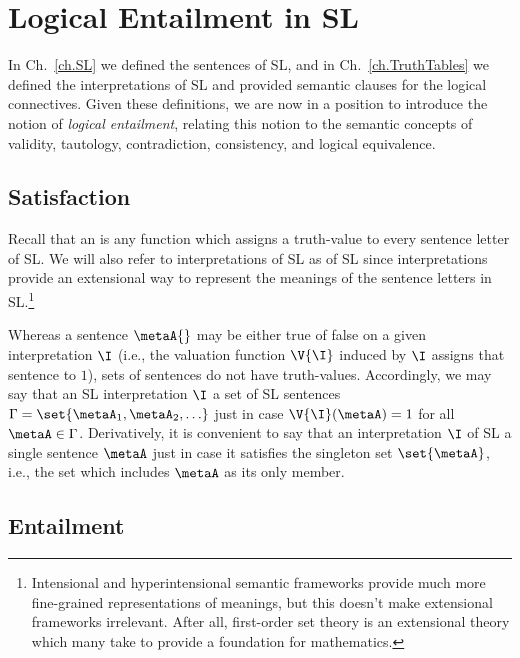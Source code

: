\chapter{Logical Entailment in SL}
\label{ch.SLmodels}

In Ch.~\ref{ch.SL} we defined the sentences of SL, and in Ch.~\ref{ch.TruthTables} we defined the interpretations of SL and provided semantic clauses for the logical connectives.
Given these definitions, we are now in a position to introduce the notion of \textit{logical entailment}, relating this notion to the semantic concepts of validity, tautology, contradiction, consistency, and logical equivalence.






\section{Satisfaction}
\label{sec:satisfaction}

Recall that an  is any function which assigns a truth-value to every sentence letter of SL.
We will also refer to interpretations of SL as  of SL since interpretations provide an extensional way to represent the meanings of the sentence letters in SL.\footnote{Intensional and hyperintensional semantic frameworks provide much more fine-grained representations of meanings, but this doesn't make extensional frameworks irrelevant. After all, first-order set theory is an extensional theory which many take to provide a foundation for mathematics.}

Whereas a sentence $\metaA{}$ may be either true of false on a given interpretation $\I$ (i.e., the valuation function $\V{\I}$ induced by $\I$ assigns that sentence to $1$), sets of sentences do not have truth-values.
Accordingly, we may say that an SL interpretation $\I$  a set of SL sentences $\Gamma=\set{\metaA_{1},\metaA_{2},\ldots}$ just in case $\V{\I}(\metaA)=1$ for all $\metaA \in \Gamma$.
Derivatively, it is convenient to say that an interpretation $\I$ of SL  a single sentence $\metaA$ just in case it satisfies the singleton set $\set{\metaA}$, i.e., the set which includes $\metaA$ as its only member. 





\section{Entailment}
  \label{sec:entailment}

